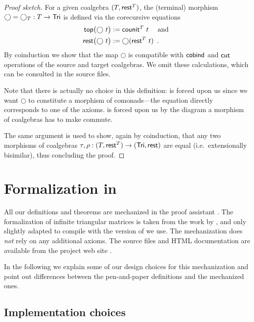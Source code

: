 \documentclass[conference,10pt]{IEEEtran}
\begin{document}
\begin{proof}[Proof sketch]
   For a given coalgebra $(T,\mathsf{rest}^T)$, the (terminal) morphism $\bigcirc = \bigcirc_T:T\to\mathsf{Tri}$ is defined via the corecursive equations
    \begin{align}\head\bigl(\bigcirc~t\bigr) &:= \counit^T~t \quad\text{ and } \label{eq:terminal_top}\\
                     \tail\bigl(\bigcirc~t\bigr) &:= \bigcirc(\tail^T~t) \enspace . \label{eq:terminal_rest}
      \end{align}
      By coinduction we show that the map $\bigcirc$ is compatible with $\mathsf{cobind}$ and $\mathsf{cut}$ operations of the source and 
   target coalgebras. We omit these calculations, which can be consulted in the \coq source files.
   
   Note that there is actually no choice in this definition:  is forced upon us since we want $\bigcirc$ to constitute 
   a morphism of comonads---the equation directly corresponds to one of the axioms.
    is forced upon us by the diagram a morphism of coalgebras has to make commute.
   
   The same argument is used to show, again by coinduction, that any two morphisms of coalgebras $\tau,\rho : (T,\mathsf{rest}^T) \to (\mathsf{Tri},\mathsf{rest})$
   are equal (i.e.\ extensionally bisimilar), thus concluding the proof.
   
   
\end{proof}




\section{Formalization in \coq}\label{sec:formal}

All our definitions and theorems are mechanized in the proof assistant \coq \parencite{coq84pl3}.
The formalization of infinite triangular matrices is taken from the work by \textcite{DBLP:conf/types/MatthesP11},
and only slightly adapted to compile with the version of \coq we use.
The mechanization does \emph{not} rely on any additional axioms.
The \coq source files and HTML documentation are available from the project web site \parencite{trimat_coq}.

In the following we explain some of our design choices for this mechanization
and point out differences between the pen-and-paper definitions and the mechanized ones.



\subsection{Implementation choices}
\end{document}
